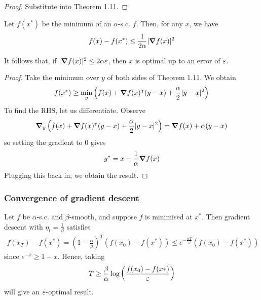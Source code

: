\documentclass{../../template/note}
\begin{document}
    \begin{proof}
        Substitute into Theorem 1.11.
    \end{proof}
    
    \begin{corollary}
        \label{alpha-sc-bound}
        Let $f(x^*)$ be the minimum of an $\alpha$-s.c. $f$. Then, for any $x$, we have
        \begin{align*}
            f(x) - f(x^*) \leq \frac 1 {2\alpha} |\grad f(x)|^2
        \end{align*}        
    \end{corollary}
    
    \begin{remark*}
        It follows that, if $|\grad f(x)|^2 \leq 2\alpha\eps$, then $x$ is optimal up to an error of $\varepsilon$.
    \end{remark*}
    
    \begin{proof}
        Take the minimum over $y$ of both sides of Theorem 1.11. We obtain
        \begin{align*}
            f(x^*) \geq \min_y \left(f(x) + \grad f(x)^\intercal (y-x) + \frac \alpha 2 |y-x|^2 \right)
        \end{align*}
        To find the RHS, let us differentiate. Observe
        \begin{align*}
            \grad_y \left(f(x) + \grad f(x)^\intercal (y-x) + \frac \alpha 2 |y-x|^2\right) = \grad f(x) + \alpha(y-x)
        \end{align*}
        so setting the gradient to 0 gives
        \begin{align*}
            y^* = x - \frac 1 \alpha \grad f(x)
        \end{align*}
        Plugging this back in, we obtain the result.       
    \end{proof}
    
    \subsubsection{Convergence of gradient descent}

    \begin{theorem}
        Let $f$ be $\alpha$-s.c. and $\beta$-smooth, and suppose $f$ is minimised at $x^*$. Then gradient descent with $\eta_t = \frac 1 \beta$ satisfies
        \begin{align*}
            f(x_T) - f(x^*) = \left(1-\frac \alpha \beta\right)^T \left(f(x_0)-f(x^*)\right) \leq e^{-\frac{\alpha T}\beta} \left(f(x_0)-f(x^*)\right)
        \end{align*}
        since $e^{-x} \geq 1-x$. Hence, taking
        \begin{align*}
            T \geq \frac \beta \alpha \log\left(\frac{f(x_0)-f(x*)}{\varepsilon}\right)
        \end{align*}
        will give an $\varepsilon$-optimal result.       
    \end{theorem}
    
\end{document}
